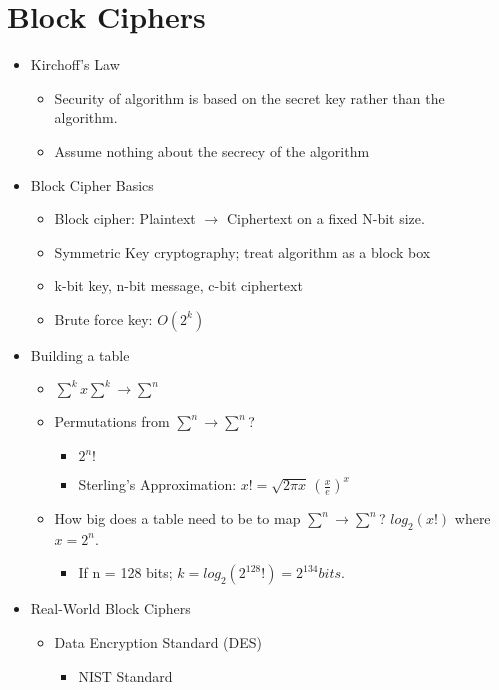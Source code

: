 \section{Block Ciphers}
\begin{itemize}
\item Kirchoff's Law
    \begin{itemize}
    \item Security of algorithm is based on the secret key rather than the algorithm.
    \item Assume nothing about the secrecy of the algorithm
    \end{itemize}
\item Block Cipher Basics
    \begin{itemize}
    \item Block cipher: Plaintext $\rightarrow$ Ciphertext on a fixed N-bit size. 
    \item Symmetric Key cryptography; treat algorithm as a block box
    \item k-bit key, n-bit message, c-bit ciphertext
    \item Brute force key: $O(2^k)$
    \end{itemize}
\item Building a table
    \begin{itemize}
    \item $\sum^k x \sum^k \rightarrow \sum^n$
    \item Permutations from $\sum^n \rightarrow \sum^n$?
        \begin{itemize}
        \item $2^n!$
        \item Sterling's Approximation: $x! = \sqrt{2\pi x}\,(\frac{x}{e})^x $
        \end{itemize}
    \item How big does a table need to be to map $\sum^n \rightarrow \sum^n$? $log_2(x!)$ where $x = 2^n$.
        \begin{itemize}
        \item If n = 128 bits; $k = log_2(2^{128}!) = 2^{134} bits.$
        \end{itemize}
    \end{itemize}
\item Real-World Block Ciphers
\begin{itemize}
    \item Data Encryption Standard (DES)
        \begin{itemize}
        \item NIST Standard

\end{itemize}
\end{itemize}
\end{itemize}
